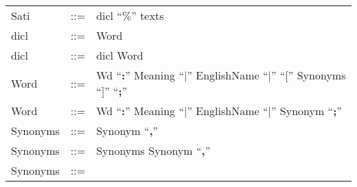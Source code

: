 \newlength{}
\newlength{}
\newlength{}
\settowidth{}
\settowidth{}
\setlength{}
\addtolength{}
\addtolength{}
\addtolength{}

\begin{longtable}{lrl}
Sati        & ::= &
  \begin{minipage}[t]{\rulerhs}
    \raggedright
    dicl ``{\bf $\%$}'' texts
  \end{minipage}                                                             \\
dicl        & ::= &
  \begin{minipage}[t]{\rulerhs}
    \raggedright
    Word
  \end{minipage}                                                             \\
dicl        & ::= &
  \begin{minipage}[t]{\rulerhs}
    \raggedright
    dicl Word
  \end{minipage}                                                             \\
Word        & ::= &
  \begin{minipage}[t]{\rulerhs}
    \raggedright
    Wd ``{\bf :}'' Meaning ``{\bf $|$}'' EnglishName ``{\bf $|$}'' ``{\bf $[$}'' Synonyms ``{\bf $]$}'' ``{\bf ;}''
  \end{minipage}                                                             \\
Word        & ::= &
  \begin{minipage}[t]{\rulerhs}
    \raggedright
    Wd ``{\bf :}'' Meaning ``{\bf $|$}'' EnglishName ``{\bf $|$}'' Synonym ``{\bf ;}''
  \end{minipage}                                                             \\
Synonyms    & ::= &
  \begin{minipage}[t]{\rulerhs}
    \raggedright
    Synonym ``{\bf ,}''
  \end{minipage}                                                             \\
Synonyms    & ::= &
  \begin{minipage}[t]{\rulerhs}
    \raggedright
    Synonyms Synonym ``{\bf ,}''
  \end{minipage}                                                             \\
Synonyms    & ::= &
  \begin{minipage}[t]{\rulerhs}

\end{minipage}
\end{longtable}
